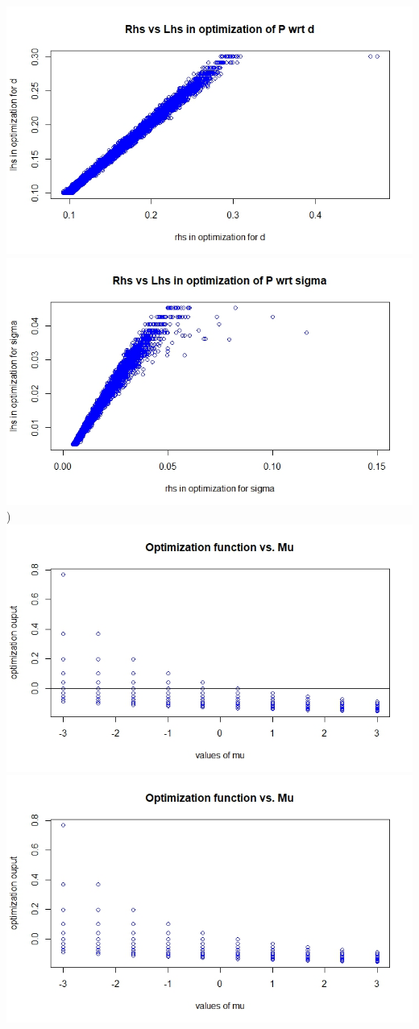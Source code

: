 \documentclass{article}
\begin{document}
\includegraphics[scale=0.4]{rld}
\includegraphics[scale=0.4]{rlsigma} \hfill{})\hfill\break
\includegraphics[scale=0.4]{OPmu}
\includegraphics[scale=0.4]{OPsigma}
\end{document}
